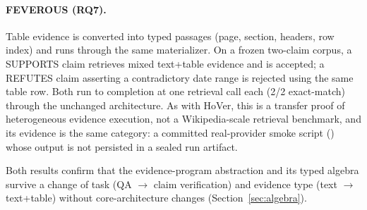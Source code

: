 \paragraph{FEVEROUS (RQ7).} Table evidence is converted into typed
 passages (page, section, headers, row index) and runs through
the same materializer. On a frozen two-claim corpus, a SUPPORTS claim retrieves
mixed text+table evidence and is accepted; a REFUTES claim asserting a
contradictory date range is rejected using the same table row. Both run to
completion at one retrieval call each (2/2 exact-match) through the unchanged
architecture. As with HoVer, this is a transfer proof of heterogeneous evidence
execution, not a Wikipedia-scale retrieval benchmark, and its evidence is the
same category: a committed real-provider smoke script
() whose output is not persisted in a
sealed run artifact.

Both results confirm that the evidence-program abstraction and its typed
algebra survive a change of task (QA $\to$ claim verification) and evidence
type (text $\to$ text+table) without core-architecture changes
(Section~\ref{sec:algebra}).
